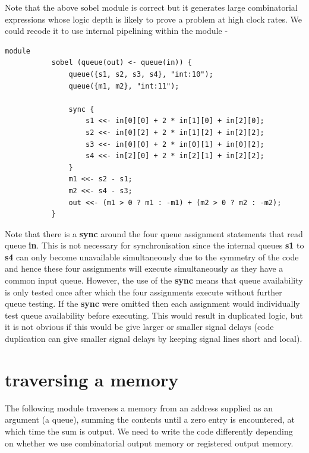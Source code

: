         Note that the above sobel module is correct but it generates large
        combinatorial expressions whose logic depth is likely to prove a problem
        at high clock rates. We could recode it to use internal pipelining
        within the module -
        \begin{lstlisting}[gobble=8, language=threepl]
           module
           sobel (queue(out) <- queue(in)) {
               queue({s1, s2, s3, s4}, "int:10");
               queue({m1, m2}, "int:11");
               
               sync {
                   s1 <<- in[0][0] + 2 * in[1][0] + in[2][0];
                   s2 <<- in[0][2] + 2 * in[1][2] + in[2][2];
                   s3 <<- in[0][0] + 2 * in[0][1] + in[0][2];
                   s4 <<- in[2][0] + 2 * in[2][1] + in[2][2];
               }
               m1 <<- s2 - s1;
               m2 <<- s4 - s3;
               out <<- (m1 > 0 ? m1 : -m1) + (m2 > 0 ? m2 : -m2);
           }
        \end{lstlisting}
        Note that there is a {\bf sync} around the four queue assignment
        statements that read queue {\bf in}. This is not necessary for
        synchronisation since the internal queues {\bf s1} to {\bf s4} can
        only become unavailable simultaneously due to the symmetry of the code
        and hence these four assignments will execute simultaneously as they
        have a common input queue. However, the use of the {\bf sync} means
        that queue availability is only tested once after which the four
        assignments execute without further queue testing. If the {\bf sync}
        were omitted then each assignment would individually test queue
        availability before executing. This would result in duplicated logic,
        but it is not obvious if this would be give larger or smaller
        signal delays (code duplication can give smaller signal delays by
        keeping signal lines short and local).
        


    \section{traversing a memory}\label{sec:traverse}

        The following module traverses a memory from an address supplied
        as an argument (a queue), summing the
        contents until a zero entry is encountered, at which time the sum
        is output. We need to write the code differently depending on whether
        we use combinatorial output memory or registered output memory.
        
